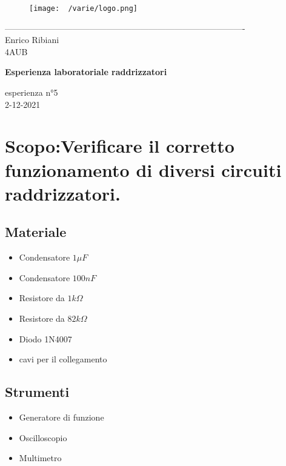 \documentclass[12pt]{article}
\begin{document}
    \begin{titlepage}
    \begin{center}
\begin{figure}
    \centering
    \texttt{[image: ~/varie/logo.png]}
    \label{fig:logo}
\end{figure}
-------------------------------------------------------------------------------------\\
\vspace{2\baselineskip}
\large Enrico Ribiani\\
\large 4AUB\\
\vfill

\Huge{\textbf{Esperienza laboratoriale raddrizzatori}}\\
\vfill

\LARGE{esperienza n°5}\\
\vfill
\large{2-12-2021}
\end{center}
\end{titlepage}
\tableofcontents
\vskip 1cm
\section{Scopo:Verificare il corretto funzionamento di diversi circuiti raddrizzatori.}
    \subsection{Materiale}
    \begin{itemize}
        \item Condensatore $1\mu F$
        \item Condensatore $100 nF$
        \item Resistore da $1k \Omega$
        \item Resistore da $82k \Omega$
        \item Diodo 1N4007
       
        \item cavi per il collegamento
    \end{itemize}
    \subsection{Strumenti}
    \begin{itemize}
        \item Generatore di funzione
        \item Oscilloscopio
        \item Multimetro
    \end{itemize}
\end{document}

